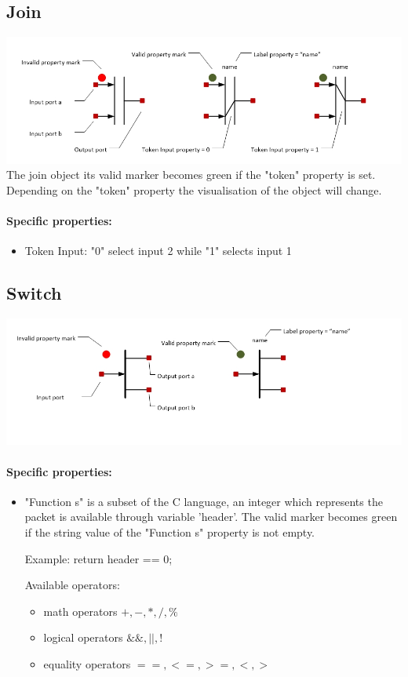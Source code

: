 \documentclass[a4paper,11pt,final]{article}
\begin{document}
\subsection{Join}
\includegraphics[width=1.0\textwidth]{join}
The join object its valid marker becomes green if the "token" property is set.
Depending on the "token" property the visualisation of the object will change.
\paragraph{Specific properties:}
\begin{itemize}
\item Token Input: "0" select input 2 while "1" selects input 1
\end{itemize}


\subsection{Switch}
\includegraphics[width=1.0\textwidth]{switch}
\paragraph{Specific properties:}
\begin{itemize}
\item "Function s" is a subset of the C language, an integer which represents the packet is available through variable 'header'.
The valid marker becomes green if the  string value of the "Function s" property is not empty.

Example: return header == 0;

Available operators:
\begin{itemize}
\item math operators $+,-,*,/,\%$
\item logical operators $\&\&,||,!$
\item equality operators $==,<=,>=,<,>$
\end{itemize}
\end{itemize}
\end{document}
